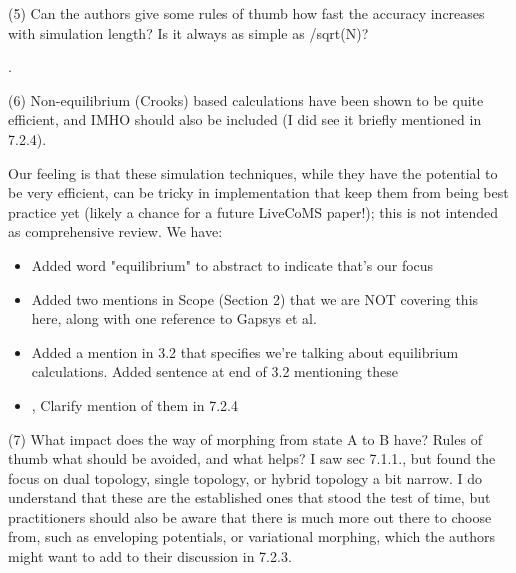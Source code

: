 \documentclass[10pt,stdletter]{newlfm}
\begin{document}
\begin{newlfm}
(5) Can the authors give some rules of thumb how fast the accuracy increases with simulation length? Is it always as simple as /sqrt(N)?

.

(6) Non-equilibrium (Crooks) based calculations have been shown to be quite efficient, and IMHO should also be included (I did see it briefly mentioned in 7.2.4).

Our feeling is that these simulation techniques, while they have the potential to be very efficient, can be tricky in implementation that keep them from being best practice yet (likely a chance for a future LiveCoMS paper!); this is not intended as comprehensive review.  We have: 

\begin{itemize}
\item Added word "equilibrium" to abstract to indicate that's our focus
\item Added two mentions in Scope (Section 2) that we are NOT covering this here, along with one reference to Gapsys et al.
\item Added a mention in 3.2 that specifies we're talking about equilibrium calculations.
Added sentence at end of 3.2 mentioning these
\item, Clarify mention of them in 7.2.4 
\end{itemize}

(7) What impact does the way of morphing from state A to B have? Rules of thumb what should be avoided, and what helps? I saw sec 7.1.1., but found the focus on dual topology, single topology, or hybrid topology a bit narrow. I do understand that these are the established ones that stood the test of time, but practitioners should also be aware that there is much more out there to choose from, such as enveloping potentials, or variational morphing, which the authors might want to add to their discussion in 7.2.3.

\color[red]{MRS: The section issues with soft core and $\lambda$ examines much of the clear lessons on simulation endpoints and pathways.  We now bring up EDS and enveloping distribution approaches as alternatives in section 7.2, but at least in this paper choose not to recommend them as best practices not because they don't work, but because they at the present time there are issues with kinetic trapping and determining scaling parameters that mean they are not the recommended way to start doing these calculations for non-experts or maximal reliability.} 


\end{newlfm}
\end{document}
